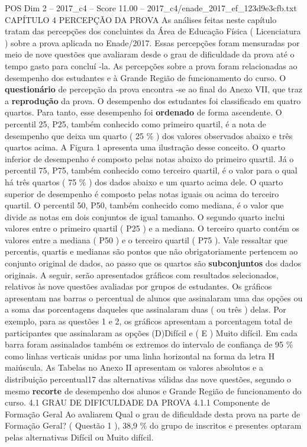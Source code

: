 \begin{textsample}{POS Dim 2 – 2017\_c4 – Score 11.00 – 2017\_c4/enade\_2017\_ef\_123d9e3cfb.txt}  \label{ex:f2_pos_092}
CAPÍTULO 4 PERCEPÇÃO DA PROVA As análises feitas neste capítulo tratam das percepções dos concluintes da Área de Educação Física ( Licenciatura ) sobre a prova aplicada no Enade/2017.
Essas percepções foram mensuradas por meio de nove questões que avaliaram desde o grau de dificuldade da prova até o tempo gasto para concluí -la.
As percepções sobre a prova foram relacionadas ao desempenho dos estudantes e à Grande Região de funcionamento do curso.
O \textbf{questionário} de percepção da prova encontra -se ao final do Anexo VII, que traz a \textbf{reprodução} da prova.
O desempenho dos estudantes foi classificado em quatro quartos.
Para tanto, esse desempenho foi \textbf{ordenado} de forma ascendente.
O percentil 25, P25, também conhecido como primeiro quartil, é a nota de desempenho que deixa um quarto ( 25 \% ) dos valores observados abaixo e três quartos acima.
A Figura 1 apresenta uma ilustração desse conceito.
O quarto inferior de desempenho é composto pelas notas abaixo do primeiro quartil.
Já o percentil 75, P75, também conhecido como terceiro quartil, é o valor para o qual há três quartos ( 75 \% ) dos dados abaixo e um quarto acima dele.
O quarto superior de desempenho é composto pelas notas iguais ou acima do terceiro quartil.
O percentil 50, P50, também conhecido como mediana, é o valor que divide as notas em dois conjuntos de igual tamanho.
O segundo quarto inclui valores entre o primeiro quartil ( P25 ) e a mediana.
O terceiro quarto contém os valores entre a mediana ( P50 ) e o terceiro quartil ( P75 ).
Vale ressaltar que percentis, quartis e medianas são pontos que não obrigatoriamente pertencem ao conjunto original de dados, ao passo que os quartos são \textbf{subconjuntos} dos dados originais.
A seguir, serão apresentados gráficos com resultados selecionados, relativos às nove questões avaliadas por grupos de estudantes.
Os gráficos apresentam nas barras o percentual de alunos que assinalaram uma das opções ou a soma das porcentagens daqueles que assinalaram duas ( ou três ) delas.
Por exemplo, para as questões 1 e 2, os gráficos apresentam a porcentagem total de participantes que assinalaram as opções (D)Difícil e ( E ) Muito difícil.
Em cada barra foram assinalados também os extremos do intervalo de confiança de 95 \% como linhas verticais unidas por uma linha horizontal na forma da letra H maiúscula.
As Tabelas no Anexo II apresentam os valores absolutos e a distribuição percentual17 das alternativas válidas das nove questões, segundo o mesmo \textbf{recorte} de desempenho dos alunos e Grande Região de funcionamento do curso. 4.1 GRAU DE DIFICULDADE DA PROVA 4.1.1 Componente de Formação Geral Ao avaliarem Qual o grau de dificuldade desta prova na parte de Formação Geral? ( Questão 1 ), 38,9 \% do grupo de inscritos e presentes optaram pelas alternativas Difícil ou Muito difícil.

\end{textsample}

